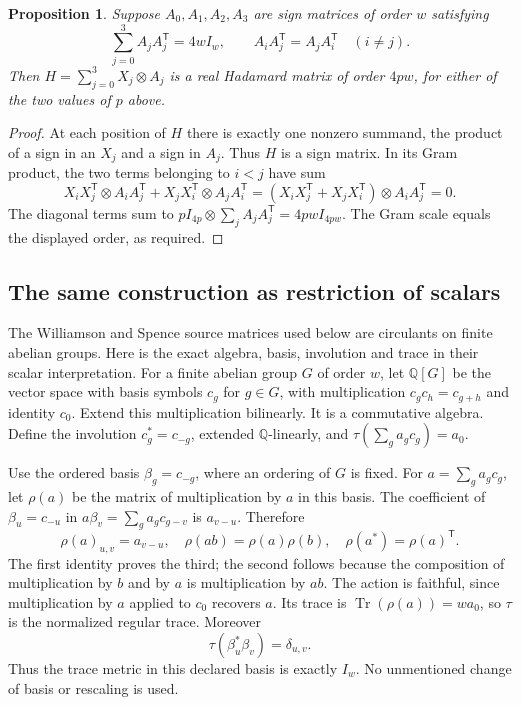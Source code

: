 \documentclass[10pt]{article}
\newtheorem{proposition}[theorem]{Proposition}
\newcommand{\Q}{\mathbb Q}
\newcommand{\Tr}{\operatorname{Tr}}
\begin{document}
\begin{proposition}\label{prop:substitution}
Suppose $A_0,A_1,A_2,A_3$ are sign matrices of order $w$ satisfying
\[
 \sum_{j=0}^3A_jA_j^{\mathsf T}=4wI_w,\qquad
 A_iA_j^{\mathsf T}=A_jA_i^{\mathsf T}\quad(i\ne j).
\]
Then $H=\sum_{j=0}^3X_j\otimes A_j$ is a real Hadamard matrix of order
$4pw$, for either of the two values of $p$ above.
\end{proposition}
\begin{proof}
At each position of $H$ there is exactly one nonzero summand, the product
of a sign in an $X_j$ and a sign in $A_j$. Thus $H$ is a sign matrix.
In its Gram product, the two terms belonging to $i<j$ have sum
\[
 X_iX_j^{\mathsf T}\otimes A_iA_j^{\mathsf T}
 +X_jX_i^{\mathsf T}\otimes A_jA_i^{\mathsf T}
 =(X_iX_j^{\mathsf T}+X_jX_i^{\mathsf T})\otimes A_iA_j^{\mathsf T}=0.
\]
The diagonal terms sum to
$pI_{4p}\otimes\sum_jA_jA_j^{\mathsf T}=4pwI_{4pw}$.
The Gram scale equals the displayed order, as required.
\end{proof}

\subsection{The same construction as restriction of scalars}\label{sec:group-algebra}
The Williamson and Spence source matrices used below are circulants on
finite abelian groups.
Here is the exact algebra, basis, involution and trace in their scalar
interpretation. For a finite abelian group $G$ of order $w$, let
$\Q[G]$ be the vector space with basis symbols $c_g$ for $g\in G$,
with multiplication $c_gc_h=c_{g+h}$ and identity $c_0$.
Extend this multiplication bilinearly. It is a commutative algebra.
Define the involution $c_g^*=c_{-g}$, extended $\Q$-linearly, and
$\tau(\sum_g a_gc_g)=a_0$.

Use the ordered basis $\beta_g=c_{-g}$, where an ordering of $G$ is fixed.
For $a=\sum_g a_gc_g$, let $\rho(a)$ be the matrix of multiplication
by $a$ in this basis. The coefficient of $\beta_u=c_{-u}$ in
$a\beta_v=\sum_g a_gc_{g-v}$ is $a_{v-u}$. Therefore
\begin{equation}\label{eq:regular-action}
 \rho(a)_{u,v}=a_{v-u},\quad
 \rho(ab)=\rho(a)\rho(b),\quad
 \rho(a^*)=\rho(a)^{\mathsf T}.
\end{equation}
The first identity proves the third; the second follows because the
composition of multiplication by $b$ and by $a$ is multiplication by
$ab$. The action is faithful, since multiplication by $a$ applied to
$c_0$ recovers $a$.
Its trace is $\Tr(\rho(a))=wa_0$, so $\tau$ is the normalized regular
trace. Moreover
\[
 \tau(\beta_u^*\beta_v)=\delta_{u,v}.
\]
Thus the trace metric in this declared basis is exactly $I_w$.
No unmentioned change of basis or rescaling is used.
\end{document}
